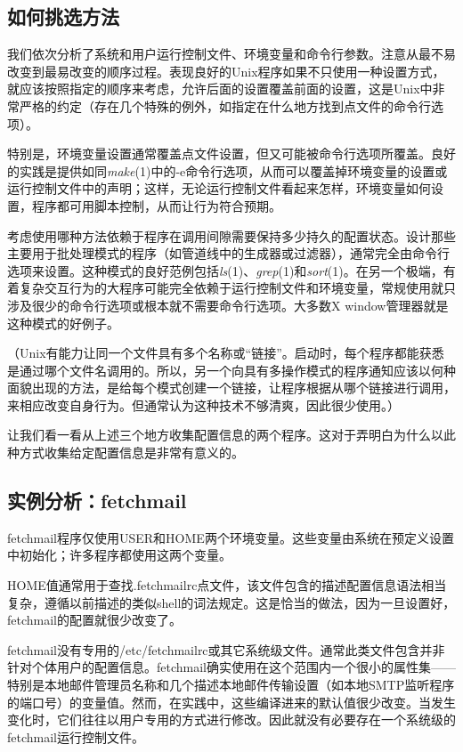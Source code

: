 \documentclass[12pt,oneside]{book}
\begin{document}
\begin{common-format}
\section{如何挑选方法}
我们依次分析了系统和用户运行控制文件、环境变量和命令行参数。注意从最不易改变到最易改变的顺序过程。表现良好的Unix程序如果不只使用一种设置方式，就应该按照指定的顺序来考虑，允许后面的设置覆盖前面的设置，这是Unix中非常严格的约定（存在几个特殊的例外，如指定在什么地方找到点文件的命令行选项）。

特别是，环境变量设置通常覆盖点文件设置，但又可能被命令行选项所覆盖。良好的实践是提供如同\textit{make}(1)中的-e命令行选项，从而可以覆盖掉环境变量的设置或运行控制文件中的声明；这样，无论运行控制文件看起来怎样，环境变量如何设置，程序都可用脚本控制，从而让行为符合预期。

考虑使用哪种方法依赖于程序在调用间隙需要保持多少持久的配置状态。设计那些主要用于批处理模式的程序（如管道线中的生成器或过滤器），通常完全由命令行选项来设置。这种模式的良好范例包括\textit{ls}(1)、\textit{grep}(1)和\textit{sort}(1)。在另一个极端，有着复杂交互行为的大程序可能完全依赖于运行控制文件和环境变量，常规使用就只涉及很少的命令行选项或根本就不需要命令行选项。大多数X window管理器就是这种模式的好例子。

（Unix有能力让同一个文件具有多个名称或“链接”。启动时，每个程序都能获悉是通过哪个文件名调用的。所以，另一个向具有多操作模式的程序通知应该以何种面貌出现的方法，是给每个模式创建一个链接，让程序根据从哪个链接进行调用，来相应改变自身行为。但通常认为这种技术不够清爽，因此很少使用。）

让我们看一看从上述三个地方收集配置信息的两个程序。这对于弄明白为什么以此种方式收集给定配置信息是非常有意义的。

\subsection{实例分析：fetchmail}
fetchmail程序仅使用USER和HOME两个环境变量。这些变量由系统在预定义设置中初始化；许多程序都使用这两个变量。

HOME值通常用于查找.fetchmailrc点文件，该文件包含的描述配置信息语法相当复杂，遵循以前描述的类似shell的词法规定。这是恰当的做法，因为一旦设置好，fetchmail的配置就很少改变了。

fetchmail没有专用的/etc/fetchmailrc或其它系统级文件。通常此类文件包含并非针对个体用户的配置信息。fetchmail确实使用在这个范围内一个很小的属性集——特别是本地邮件管理员名称和几个描述本地邮件传输设置（如本地SMTP监听程序的端口号）的变量值。然而，在实践中，这些编译进来的默认值很少改变。当发生变化时，它们往往以用户专用的方式进行修改。因此就没有必要存在一个系统级的fetchmail运行控制文件。


\end{common-format}
\end{document}
